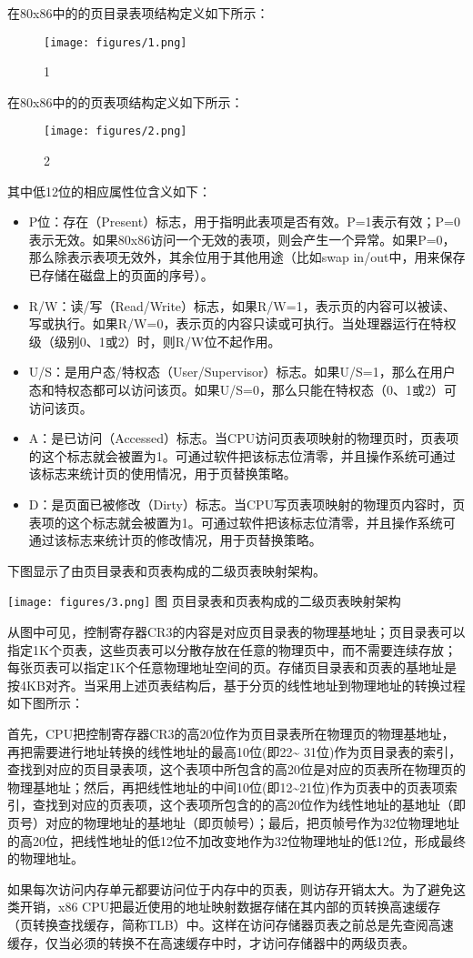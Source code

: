 在80x86中的的页目录表项结构定义如下所示：

\begin{figure}[htbp]
\centering
\texttt{[image: figures/1.png]}
\caption{1}
\end{figure}

在80x86中的的页表项结构定义如下所示：

\begin{figure}[htbp]
\centering
\texttt{[image: figures/2.png]}
\caption{2}
\end{figure}

其中低12位的相应属性位含义如下：

\begin{itemize}
\item
  P位：存在（Present）标志，用于指明此表项是否有效。P=1表示有效；P=0表示无效。如果80x86访问一个无效的表项，则会产生一个异常。如果P=0，那么除表示表项无效外，其余位用于其他用途（比如swap
  in/out中，用来保存已存储在磁盘上的页面的序号）。
\item
  R/W：读/写（Read/Write）标志，如果R/W=1，表示页的内容可以被读、写或执行。如果R/W=0，表示页的内容只读或可执行。当处理器运行在特权级（级别0、1或2）时，则R/W位不起作用。
\item
  U/S：是用户态/特权态（User/Supervisor）标志。如果U/S=1，那么在用户态和特权态都可以访问该页。如果U/S=0，那么只能在特权态（0、1或2）可访问该页。
\item
  A：是已访问（Accessed）标志。当CPU访问页表项映射的物理页时，页表项的这个标志就会被置为1。可通过软件把该标志位清零，并且操作系统可通过该标志来统计页的使用情况，用于页替换策略。
\item
  D：是页面已被修改（Dirty）标志。当CPU写页表项映射的物理页内容时，页表项的这个标志就会被置为1。可通过软件把该标志位清零，并且操作系统可通过该标志来统计页的修改情况，用于页替换策略。
\end{itemize}

下图显示了由页目录表和页表构成的二级页表映射架构。

\texttt{[image: figures/3.png]} 图 页目录表和页表构成的二级页表映射架构

从图中可见，控制寄存器CR3的内容是对应页目录表的物理基地址；页目录表可以指定1K个页表，这些页表可以分散存放在任意的物理页中，而不需要连续存放；每张页表可以指定1K个任意物理地址空间的页。存储页目录表和页表的基地址是按4KB对齐。当采用上述页表结构后，基于分页的线性地址到物理地址的转换过程如下图所示：

首先，CPU把控制寄存器CR3的高20位作为页目录表所在物理页的物理基地址，再把需要进行地址转换的线性地址的最高10位(即22\textasciitilde{}
31位)作为页目录表的索引，查找到对应的页目录表项，这个表项中所包含的高20位是对应的页表所在物理页的物理基地址；然后，再把线性地址的中间10位(即12\textasciitilde{}21位)作为页表中的页表项索引，查找到对应的页表项，这个表项所包含的的高20位作为线性地址的基地址（即页号）对应的物理地址的基地址（即页帧号）；最后，把页帧号作为32位物理地址的高20位，把线性地址的低12位不加改变地作为32位物理地址的低12位，形成最终的物理地址。

如果每次访问内存单元都要访问位于内存中的页表，则访存开销太大。为了避免这类开销，x86
CPU把最近使用的地址映射数据存储在其内部的页转换高速缓存（页转换查找缓存，简称TLB）中。这样在访问存储器页表之前总是先查阅高速缓存，仅当必须的转换不在高速缓存中时，才访问存储器中的两级页表。
